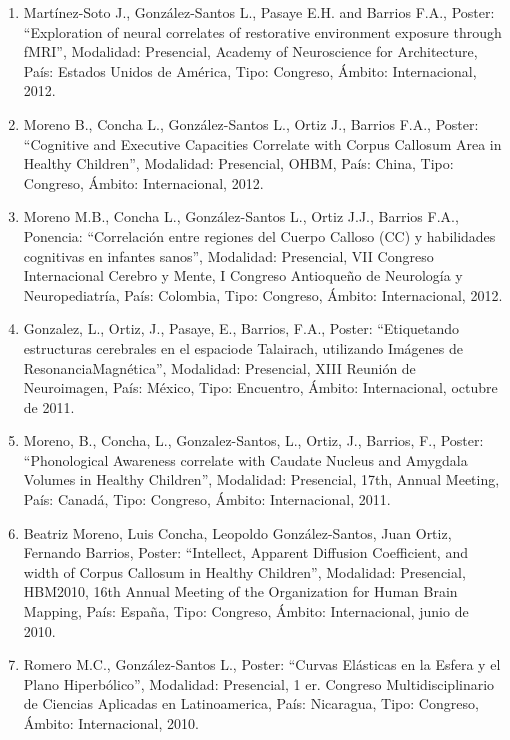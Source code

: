 \begin{enumerate}
\item Martínez-Soto J., González-Santos L., Pasaye E.H. and Barrios F.A., Poster: “Exploration of neural 
correlates 
of restorative environment exposure through fMRI”, Modalidad: Presencial, Academy of Neuroscience for 
Architecture, País: Estados Unidos de América, Tipo: Congreso, Ámbito: Internacional, 2012.

\item Moreno B., Concha L., González-Santos L., Ortiz J., Barrios F.A., Poster: “Cognitive and Executive 
Capacities 
Correlate with Corpus Callosum Area in Healthy Children”, Modalidad: Presencial, OHBM, País: China, Tipo: 
Congreso, Ámbito: Internacional, 2012.

\item Moreno M.B., Concha L., González-Santos L., Ortiz J.J., Barrios F.A., Ponencia: “Correlación entre 
regiones 
del Cuerpo Calloso (CC) y habilidades cognitivas en infantes sanos”, Modalidad: Presencial, VII Congreso 
Internacional Cerebro y Mente, I Congreso Antioqueño de Neurología y Neuropediatría, País: Colombia, Tipo: 
Congreso, Ámbito: Internacional, 2012.

\item Gonzalez, L., Ortiz, J., Pasaye, E., Barrios, F.A., Poster: “Etiquetando estructuras cerebrales en el 
espaciode Talairach, utilizando Imágenes de ResonanciaMagnética”, Modalidad: Presencial, XIII Reunión de 
Neuroimagen, País: México, Tipo: Encuentro, Ámbito: Internacional, octubre de 2011.

\item Moreno, B., Concha, L., Gonzalez-Santos, L., Ortiz, J., Barrios, F., Poster: “Phonological Awareness 
correlate 
with Caudate Nucleus and Amygdala Volumes in Healthy Children”, Modalidad: Presencial, 17th, Annual Meeting, 
País: Canadá, Tipo: Congreso, Ámbito: Internacional, 2011.

\item Beatriz Moreno, Luis Concha, Leopoldo González-Santos, Juan Ortiz, Fernando Barrios, Poster: “Intellect, 
Apparent Diffusion Coefficient, and width of Corpus Callosum in Healthy Children”, Modalidad: Presencial, 
HBM2010, 16th Annual Meeting of the Organization for Human Brain Mapping, País: España, Tipo: Congreso, 
Ámbito: Internacional, junio de 2010.

\item Romero M.C., González-Santos L., Poster: “Curvas Elásticas en la Esfera y el Plano Hiperbólico”, 
Modalidad: 
Presencial, 1 er. Congreso Multidisciplinario de Ciencias Aplicadas en Latinoamerica, País: Nicaragua, Tipo: 
Congreso, Ámbito: Internacional, 2010.


\end{enumerate}
